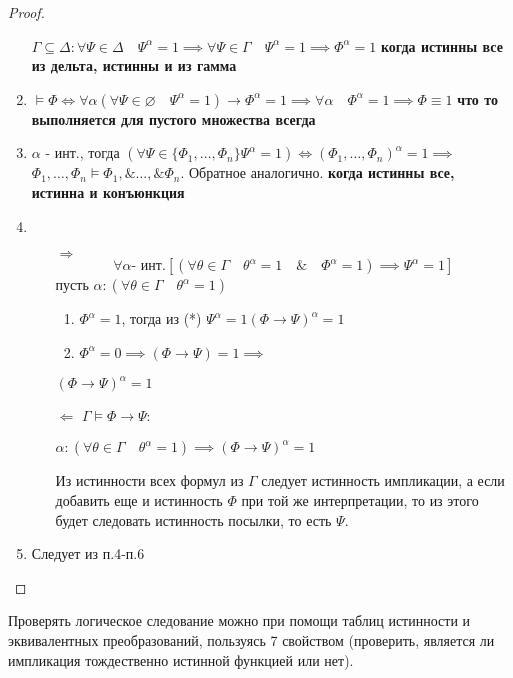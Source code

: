 \documentclass[a4paper]{article}
\theoremstyle{definition}
\theoremstyle{remark}
\begin{document}
\begin{proof}
\begin{enumerate}
            $\Gamma \subseteq \Delta: \forall\Psi\in\Delta \quad \Psi^\alpha = 1\implies \forall\Psi\in\Gamma \quad \Psi^\alpha = 1\implies \Phi^\alpha = 1$
            \textbf{когда истинны все из дельта, истинны и из гамма}
            \item $\models \Phi \Leftrightarrow \forall \alpha (\forall \Psi \in \varnothing\quad \Psi^\alpha = 1)\to \Phi^\alpha = 1 \implies \forall \alpha \quad \Phi^\alpha = 1\implies \Phi \equiv 1$
            \textbf{что то выполняется для пустого множества всегда}
            \item $\alpha$ - инт., тогда $(\forall \Psi \in \{ \Phi_1, \dots, \Phi_n\} \Psi^\alpha = 1)\Leftrightarrow (\Phi_1, \dots, \Phi_n)^\alpha = 1\implies$
            $\Phi_1, \dots, \Phi_n\models \Phi_1,\& \dots,\& \Phi_n$.
            Обратное аналогично. \textbf{когда истинны все, истинна и конъюнкция}
            \item \begin{itemize}
                \item[$\Rightarrow$]
                    \begin{equation}
                        \forall \alpha \text{- инт.}[(\forall \theta \in \Gamma\quad \theta^\alpha = 1\quad \&\quad \Phi^\alpha = 1)\implies \Psi^\alpha = 1]\tag{*}
                    \end{equation}    
                    пусть $\alpha: (\forall \theta \in \Gamma \quad \theta^\alpha = 1)$  
                    \begin{enumerate}
                        \item $\Phi^\alpha= 1$, тогда из (*) $\Psi^\alpha = 1 (\Phi\to \Psi)^\alpha = 1$
                        \item $\Phi^\alpha = 0\implies (\Phi\to\Psi) = 1\implies$
                    \end{enumerate}     
                    $(\Phi\to \Psi)^\alpha = 1$ 
                \item[$\Leftarrow$] $\Gamma \models \Phi\to \Psi:$
                
                $\alpha: (\forall \theta \in \Gamma \quad \theta^\alpha = 1)\implies (\Phi\to \Psi)^\alpha = 1$

                Из истинности всех формул из $\Gamma$ следует истинность импликации, а если добавить еще и 
                истинность $\Phi$ при той же интерпретации, то из этого будет следовать истинность посылки, то есть $\Psi$.  
            \end{itemize}
            \item Следует из п.4-п.6
        \end{enumerate}
    \end{proof}
    Проверять логическое следование можно при помощи таблиц истинности и эквивалентных преобразований, пользуясь 7 свойством
    (проверить, является ли импликация тождественно истинной функцией или нет).
\end{document}
